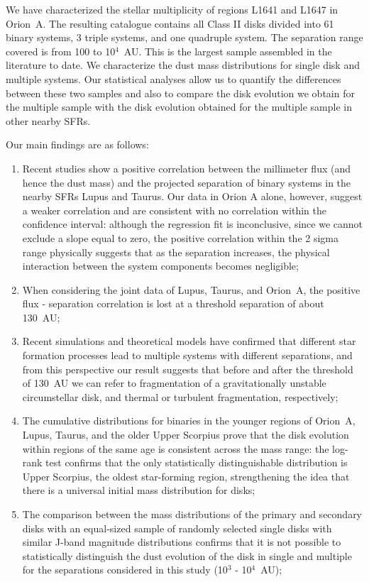 \documentclass{aa}
\begin{document}
We have characterized the stellar multiplicity of regions L1641 and L1647 in Orion~A. The resulting catalogue contains all Class II disks divided into 61 binary systems, 3 triple systems, and one quadruple system. The separation range covered is from 100 to 10$^4$~AU. This is the largest sample assembled in the literature to date. We characterize the dust mass distributions for single disk and multiple systems. Our statistical analyses allow us to quantify the differences between these two samples and also to compare the disk evolution we obtain for the multiple sample with the disk evolution obtained for the multiple sample in other nearby SFRs. \par 
Our main findings are as follows:
\begin{enumerate}
    \item Recent studies \citep[e.g.,][]{Harris_2012, Zagaria21} show a positive correlation between the millimeter flux (and hence the dust mass) and the projected separation of binary systems in the nearby SFRs Lupus and Taurus. Our data in Orion A alone, however, suggest a weaker correlation and are consistent with no correlation within the confidence interval: although the regression fit is inconclusive, since we cannot exclude a slope equal to zero, the positive correlation within the 2 sigma range physically suggests that as the separation increases, the physical interaction between the system components becomes negligible;
    \item When considering the joint data of Lupus, Taurus, and Orion~A, the positive flux - separation correlation is lost at a threshold separation of about 130~AU; 
    \item Recent simulations and theoretical models have confirmed that different star formation processes lead to multiple systems with different separations, and from this perspective our result suggests that before and after the threshold of 130~AU we can refer to fragmentation of a gravitationally unstable circumstellar disk, and thermal or turbulent fragmentation, respectively;
    \item The cumulative distributions for binaries in the younger regions of Orion~A, Lupus, Taurus, and the older Upper Scorpius prove that the disk evolution within regions of the same age is consistent across the mass range: the log-rank test confirms that the only statistically distinguishable distribution is Upper Scorpius, the oldest star-forming region, strengthening the idea that there is a universal initial mass distribution for disks;
    \item The comparison between the mass distributions of the primary and secondary disks with an equal-sized sample of randomly selected single disks with similar J-band magnitude distributions confirms that it is not possible to statistically distinguish the dust evolution of the disk in single and multiple for the separations considered in this study (10$^3$ - 10$^4$~AU); 

\end{enumerate}
\end{document}
